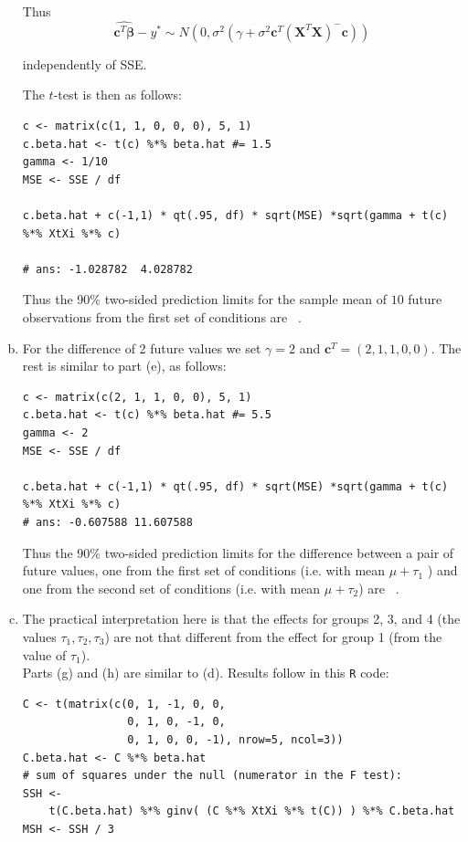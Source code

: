 \documentclass[paper=a4, fontsize=11pt]{scrartcl} %
\newcommand{\vecBeta}{\mathbf{\beta}}
\newcommand{\vecC}{\mathbf{c}}
\newcommand{\matX}{\mathbf{X}}
\begin{document}
\begin{enumerate}[(a)]
Thus 
$$
\widehat{\vecC^T \vecBeta} - y^* \sim  N \left( 0, \sigma^2 (\gamma + \sigma^2\vecC^T (\matX^T \matX)^- \vecC) \right)
$$

independently of SSE. 






The $t$-test is then as follows:\\

 \begin{lstlisting}[basicstyle=\ttfamily\small\bfseries]
c <- matrix(c(1, 1, 0, 0, 0), 5, 1)
c.beta.hat <- t(c) %*% beta.hat #= 1.5
gamma <- 1/10
MSE <- SSE / df

c.beta.hat + c(-1,1) * qt(.95, df) * sqrt(MSE) *sqrt(gamma + t(c) %*% XtXi %*% c)

# ans: -1.028782  4.028782
\end{lstlisting}

Thus the 90\% two-sided prediction limits for the sample mean of $10$ future observations from
the first set of conditions are  \ . \\



\item For the difference of 2 future values we set $\gamma = 2$ and $\vecC^T = (2, 1, 1, 0, 0)$. The rest
is similar to part (e), as follows:\\
 \begin{lstlisting}[basicstyle=\ttfamily\small\bfseries]
c <- matrix(c(2, 1, 1, 0, 0), 5, 1)
c.beta.hat <- t(c) %*% beta.hat #= 5.5
gamma <- 2
MSE <- SSE / df

c.beta.hat + c(-1,1) * qt(.95, df) * sqrt(MSE) *sqrt(gamma + t(c) %*% XtXi %*% c)
# ans: -0.607588 11.607588
\end{lstlisting}

Thus the 90\% two-sided prediction limits for the difference between a pair of future values, one
from the first set of conditions (i.e. with mean  $\mu + \tau_1$ ) and one from the second set of conditions
(i.e. with mean  $\mu + \tau_2$) are  \ . \\


\item The practical interpretation here is that the effects for groups 2, 3, and 4 (the values $\tau_1, \tau_2, \tau_3$) are not that different 
from the effect for group 1 (from the value of $\tau_1$). \\

Parts (g) and (h) are similar to (d). Results follow in this \texttt{R} code:\\
 \begin{lstlisting}[basicstyle=\ttfamily\small\bfseries]
C <- t(matrix(c(0, 1, -1, 0, 0,
                0, 1, 0, -1, 0,
                0, 1, 0, 0, -1), nrow=5, ncol=3))
C.beta.hat <- C %*% beta.hat
# sum of squares under the null (numerator in the F test):
SSH <-
    t(C.beta.hat) %*% ginv( (C %*% XtXi %*% t(C)) ) %*% C.beta.hat
MSH <- SSH / 3


\end{lstlisting}
\end{enumerate}
\end{document}
